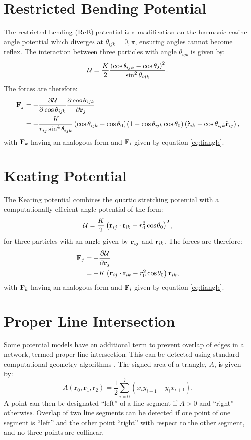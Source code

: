 \section{Restricted Bending Potential}

The restricted bending (ReB) potential is a modification on the harmonic cosine angle potential which diverges at $\theta_{ijk}=0,\pi$, ensuring angles cannot become reflex.
The interaction between three particles with angle $\theta_{ijk}$ is given by:
\begin{equation}
	\mathcal{U} = \frac{K}{2}\frac{\left(\cos\theta_{ijk}-\cos\theta_0\right)^2}{\sin^2\theta_{ijk}}.
\end{equation}
The forces are therefore:
\begin{align}
	\mathbf{F}_j&=-\frac{\partial \mathcal{U}}{\partial \cos\theta_{ijk}} \frac{\partial \cos\theta_{ijk}}{\partial \mathbf{r}_j} \nonumber \\ 
	&=-\frac{K}{r_{ij}\sin^4\theta_{ijk}}\left(\cos\theta_{ijk}-\cos\theta_0\right)\left(1-\cos\theta_{ijk}\cos\theta_0\right)\left(\boldsymbol{\hat{\mathbf{r}}}_{ik}-\cos\theta_{ijk}\boldsymbol{\hat{\mathbf{r}}}_{ij}\right) ,
\end{align}
with $\mathbf{F}_k$ having an analogous form and $\mathbf{F}_i$ given by equation \eqref{eq:fiangle}.

\section{Keating Potential}

The Keating potential combines the quartic stretching potential with a computationally efficient angle potential of the form:
\begin{equation}
	\mathcal{U} = \frac{K}{2}\left(\mathbf{r}_{ij}\cdot\mathbf{r}_{ik}-r_0^2\cos\theta_0\right)^2,
\end{equation}
for three particles with an angle given by $\mathbf{r}_{ij}$ and $\mathbf{r}_{ik}$.
The forces are therefore:
\begin{align}
	\mathbf{F}_j&=-\frac{\partial \mathcal{U}}{\partial \mathbf{r}_j} \nonumber \\ 
	&=-K\left(\mathbf{r}_{ij}\cdot\mathbf{r}_{ik}-r_0^2\cos\theta_0\right)\mathbf{r}_{ik} ,
\end{align}
with $\mathbf{F}_k$ having an analogous form and $\mathbf{F}_i$ given by equation \eqref{eq:fiangle}.

\section{Proper Line Intersection}

Some potential models have an additional term to prevent overlap of edges in a \td{} network, termed proper line intersection.
This can be detected using standard computational geometry algorithms \cite{ORourke1998}.
The signed area of a triangle, $A$, is given by:
\begin{equation}
	A\left(\mathbf{r}_0, \mathbf{r}_1, \mathbf{r}_2\right) = \frac{1}{2}\sum_{i=0}^{2} \left(x_iy_{i+1}-y_ix_{i+1}\right).
\end{equation}
A point can then be designated ``left'' of a line segment if $A>0$ and ``right'' otherwise.
Overlap of two line segments can be detected if one point of one segment is ``left'' and the other point ``right'' with respect to the other segment, and no three points are collinear.
\resumetocwriting